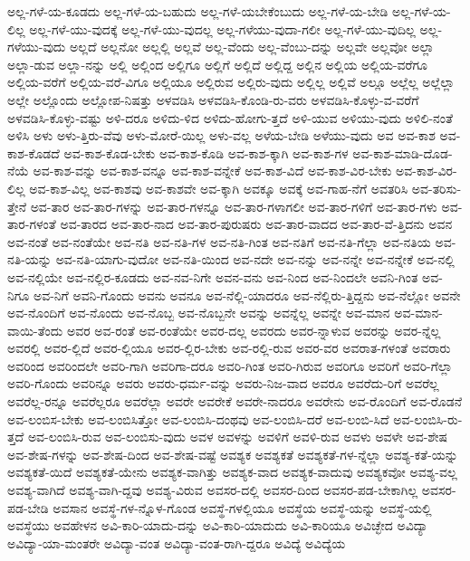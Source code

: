 {ಅಲ್ಲ-ಗಳೆ-ಯ-ಕೂಡದು
ಅಲ್ಲ-ಗಳೆ-ಯ-ಬಹುದು
ಅಲ್ಲ-ಗಳೆ-ಯಬೇಕೆಂಬುದು
ಅಲ್ಲ-ಗಳೆ-ಯ-ಬೇಡಿ
ಅಲ್ಲ-ಗಳೆ-ಯ-ಲಿಲ್ಲ
ಅಲ್ಲ-ಗಳೆ-ಯು-ವುದಕ್ಕೆ
ಅಲ್ಲ-ಗಳೆ-ಯು-ವುದಲ್ಲ
ಅಲ್ಲ-ಗಳೆಯು-ವುದಾ-ಗಲೀ
ಅಲ್ಲ-ಗಳೆ-ಯು-ವುದಿಲ್ಲ
ಅಲ್ಲ-ಗಳೆಯು-ವುದು
ಅಲ್ಲದೆ
ಅಲ್ಲನೋ
ಅಲ್ಲಲ್ಲಿ
ಅಲ್ಲವೆ
ಅಲ್ಲ-ವೆಂದು
ಅಲ್ಲ-ವೆಂಬು-ದನ್ನು
ಅಲ್ಲವೇ
ಅಲ್ಲವೋ
ಅಲ್ಲಾ
ಅಲ್ಲಾ-ಡುವ
ಅಲ್ಲಾ-ನನ್ನು
ಅಲ್ಲಿ
ಅಲ್ಲಿಂದ
ಅಲ್ಲಿಗೂ
ಅಲ್ಲಿಗೆ
ಅಲ್ಲಿದೆ
ಅಲ್ಲಿದ್ದ
ಅಲ್ಲಿನ
ಅಲ್ಲಿಯ
ಅಲ್ಲಿಯ-ವರೆಗೂ
ಅಲ್ಲಿಯ-ವರೆಗೆ
ಅಲ್ಲಿಯ-ವರೆ-ವಿಗೂ
ಅಲ್ಲಿಯೂ
ಅಲ್ಲಿರುವ
ಅಲ್ಲಿರು-ವುದು
ಅಲ್ಲಿಲ್ಲ
ಅಲ್ಲಿವೆ
ಅಲ್ಲೂ
ಅಲ್ಲೆಲ್ಲ
ಅಲ್ಲೆಲ್ಲಾ
ಅಲ್ಲೇ
ಅಲ್ಲೊಂದು
ಅಲ್ಲೋಪ-ನಿಷತ್ತು
ಅಳವಡಿಸಿ
ಅಳವಡಿಸಿ-ಕೊಂಡಿ-ರು-ವರು
ಅಳವಡಿಸಿ-ಕೊಳ್ಳು-ವ-ವರೆಗೆ
ಅಳವಡಿಸಿ-ಕೊಳ್ಳು-ವಷ್ಟು
ಅಳಿ-ದರೂ
ಅಳಿದು-ಳಿದ
ಅಳಿದು-ಹೋಗು-ತ್ತದೆ
ಅಳಿ-ಯುವ
ಅಳಿಯು-ವುದು
ಅಳಿಲಿ-ನಂತೆ
ಅಳಿಸಿ
ಅಳು
ಅಳು-ತ್ತಿರು-ವೆವು
ಅಳು-ಮೋರೆ-ಯಿಲ್ಲ
ಅಳು-ವಲ್ಲ
ಅಳೆಯ-ಬೇಡಿ
ಅಳೆಯು-ವುದು
ಅವ
ಅವ-ಕಾಶ
ಅವ-ಕಾಶ-ಕೊಡದೆ
ಅವ-ಕಾಶ-ಕೊಡ-ಬೇಕು
ಅವ-ಕಾಶ-ಕೊಡಿ
ಅವ-ಕಾಶ-ಕ್ಕಾಗಿ
ಅವ-ಕಾಶ-ಗಳ
ಅವ-ಕಾಶ-ಮಾಡಿ-ದೊಡ-ನೆಯೆ
ಅವ-ಕಾಶ-ವನ್ನು
ಅವ-ಕಾಶ-ವನ್ನೂ
ಅವ-ಕಾಶ-ವನ್ನೇಕೆ
ಅವ-ಕಾಶ-ವಿದೆ
ಅವ-ಕಾಶ-ವಿರ-ಬೇಕು
ಅವ-ಕಾಶ-ವಿರ-ಲಿಲ್ಲ
ಅವ-ಕಾಶ-ವಿಲ್ಲ
ಅವ-ಕಾಶವು
ಅವ-ಕಾಶವೇ
ಅವ-ಕ್ಕಾಗಿ
ಅವಕ್ಕೂ
ಅವಕ್ಕೆ
ಅವ-ಗಾಹ-ನೆಗೆ
ಅವತರಿಸಿ
ಅವ-ತರಿಸು-ತ್ತೇನೆ
ಅವ-ತಾರ
ಅವ-ತಾರ-ಗಳನ್ನು
ಅವ-ತಾರ-ಗಳನ್ನೂ
ಅವ-ತಾರ-ಗಳಾಗಲೀ
ಅವ-ತಾರ-ಗಳಿಗೆ
ಅವ-ತಾರ-ಗಳು
ಅವ-ತಾರ-ಗಳಂತೆ
ಅವ-ತಾರದ
ಅವ-ತಾರ-ನಾದ
ಅವ-ತಾರ-ಪುರುಷರು
ಅವ-ತಾರ-ವಾದದ
ಅವ-ತಾರ-ವೆ-ತ್ತಿದನು
ಅವನ
ಅವ-ನಂತೆ
ಅವ-ನಂತೆಯೇ
ಅವ-ನತಿ
ಅವ-ನತಿ-ಗಳ
ಅವ-ನತಿ-ಗಿಂತ
ಅವ-ನತಿಗೆ
ಅವ-ನತಿ-ಗೆಲ್ಲಾ
ಅವ-ನತಿಯ
ಅವ-ನತಿ-ಯನ್ನು
ಅವ-ನತಿ-ಯಾಗು-ವುದೋ
ಅವ-ನತಿ-ಯಿಂದ
ಅವ-ನದೇ
ಅವ-ನನ್ನು
ಅವ-ನನ್ನೇ
ಅವ-ನನ್ನೇಕೆ
ಅವ-ನಲ್ಲಿ
ಅವ-ನಲ್ಲಿಯೇ
ಅವ-ನಲ್ಲಿರ-ಕೂಡದು
ಅವ-ನವ-ನಿಗೇ
ಅವನ-ವನು
ಅವ-ನಿಂದ
ಅವ-ನಿಂದಲೇ
ಅವನಿ-ಗಿಂತ
ಅವ-ನಿಗೂ
ಅವ-ನಿಗೆ
ಅವನಿ-ಗೊಂದು
ಅವನು
ಅವನೂ
ಅವ-ನೆಲ್ಲಿ-ಯಾದರೂ
ಅವ-ನೆಲ್ಲಿರು-ತ್ತಿದ್ದನು
ಅವ-ನೆಲ್ಲೋ
ಅವನೇ
ಅವ-ನೊಂದಿಗೆ
ಅವ-ನೊಂದು
ಅವ-ನೊಬ್ಬ
ಅವ-ನೊಬ್ಬನೇ
ಅವನ್ನು
ಅವನ್ನೆಲ್ಲ
ಅವನ್ನೇ
ಅವ-ಮಾನ
ಅವ-ಮಾನ-ವಾಯಿ-ತೆಂದು
ಅವರ
ಅವ-ರಂತೆ
ಅವ-ರಂತೆಯೇ
ಅವರ-ದಲ್ಲ
ಅವರದು
ಅವರ-ನ್ನಾಳುವ
ಅವರನ್ನು
ಅವರ-ನ್ನೆಲ್ಲ
ಅವರಲ್ಲಿ
ಅವರ-ಲ್ಲಿದೆ
ಅವರ-ಲ್ಲಿಯೂ
ಅವರ-ಲ್ಲಿರ-ಬೇಕು
ಅವ-ರಲ್ಲಿ-ರುವ
ಅವರ-ವರ
ಅವರಾತ-ಗಳಂತೆ
ಅವರಾರು
ಅವರಿಂದ
ಅವರಿಂದಲೇ
ಅವರಿ-ಗಾಗಿ
ಅವರಿಗಾ-ದರೂ
ಅವರಿ-ಗಿಂತ
ಅವರಿ-ಗಿರುವ
ಅವರಿಗೂ
ಅವರಿಗೆ
ಅವರಿ-ಗೆಲ್ಲಾ
ಅವರಿ-ಗೊಂದು
ಅವರಿನ್ನೂ
ಅವರು
ಅವರು-ಧರ್ಮ-ವನ್ನು
ಅವರು-ನಿಜ-ವಾದ
ಅವರೂ
ಅವರೆದು-ರಿಗೆ
ಅವರೆಲ್ಲ
ಅವರೆಲ್ಲ-ರನ್ನೂ
ಅವರೆಲ್ಲರೂ
ಅವರೆಲ್ಲಾ
ಅವರೇ
ಅವರೇಕೆ
ಅವರೇ-ನಾದರೂ
ಅವರೇನು
ಅವ-ರೊಂದಿಗೆ
ಅವ-ರೊಡನೆ
ಅವ-ಲಂಬಿಸ-ಬೇಕು
ಅವ-ಲಂಬಿಸಿತ್ತೋ
ಅವ-ಲಂಬಿಸಿ-ದಂಥವು
ಅವ-ಲಂಬಿಸಿ-ದರೆ
ಅವ-ಲಂಬಿ-ಸಿದೆ
ಅವ-ಲಂಬಿಸಿ-ರು-ತ್ತದೆ
ಅವ-ಲಂಬಿಸಿ-ರುವ
ಅವ-ಲಂಬಿಸು-ವುದು
ಅವಳ
ಅವಳನ್ನು
ಅವಳಿಗೆ
ಅವಳಿ-ರುವ
ಅವಳು
ಅವಳೇ
ಅವ-ಶೇಷ
ಅವ-ಶೇಷ-ಗಳನ್ನು
ಅವ-ಶೇಷ-ದಿಂದ
ಅವ-ಶೇಷ-ವಷ್ಟೆ
ಅವಶ್ಯಕ
ಅವಶ್ಯಕತೆ
ಅವಶ್ಯಕತೆ-ಗಳ-ನ್ನೆಲ್ಲಾ
ಅವಶ್ಯ-ಕತೆ-ಯನ್ನು
ಅವಶ್ಯಕತೆ-ಯಿದೆ
ಅವಶ್ಯಕತೆ-ಯೇನು
ಅವಶ್ಯಕ-ವಾಗಿತ್ತು
ಅವಶ್ಯಕ-ವಾದ
ಅವಶ್ಯಕ-ವಾದುವು
ಅವಶ್ಯಕವೋ
ಅವಶ್ಯ-ವಲ್ಲ
ಅವಶ್ಯ-ವಾಗಿದೆ
ಅವಶ್ಯ-ವಾಗಿ-ದ್ದವು
ಅವಶ್ಯ-ವಿರುವ
ಅವಸರ-ದಲ್ಲಿ
ಅವಸರ-ದಿಂದ
ಅವಸರ-ಪಡ-ಬೇಕಾಗಿಲ್ಲ
ಅವಸರ-ಪಡ-ಬೇಡಿ
ಅವಸಾನ
ಅವಸ್ಥೆ-ಗಳ-ನ್ನೊಳ-ಗೊಂಡ
ಅವಸ್ಥೆ-ಗಳಲ್ಲಿಯೂ
ಅವಸ್ಥೆಯ
ಅವಸ್ಥೆ-ಯನ್ನು
ಅವಸ್ಥೆ-ಯಲ್ಲಿ
ಅವಸ್ಥೆಯು
ಅವಹೇಳನ
ಅವಿ-ಕಾರಿ-ಯಾದು-ದನ್ನು
ಅವಿ-ಕಾರಿ-ಯಾದುದು
ಅವಿ-ಕಾರಿಯೂ
ಅವಿಚ್ಛೇದ
ಅವಿದ್ಯಾ
ಅವಿದ್ಯಾ-ಯಾ-ಮಂತರೇ
ಅವಿದ್ಯಾ-ವಂತ
ಅವಿದ್ಯಾ-ವಂತ-ರಾಗಿ-ದ್ದರೂ
ಅವಿದ್ಯೆ
ಅವಿದ್ಯೆಯ
}

